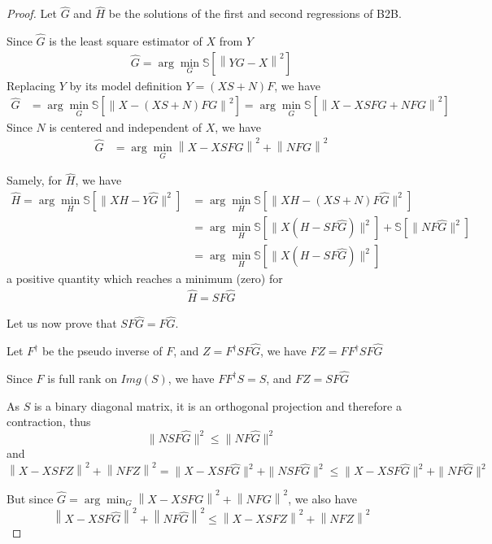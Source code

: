 \documentclass{article}
\begin{document}
\begin{proof}

 Let $\hat G$ and $\hat H$ be the solutions of the first and second regressions of B2B.

 Since $\hat G$ is the least square estimator of $X$ from $Y$
 \begin{align*}
    \hat G = \arg \min_G \mathbb{S}[\left \| YG - X \right \|^2]
\end{align*}
Replacing $Y$ by its model definition $Y = (XS+N)F$, we have
 \begin{align*}
    \hat G &=   \arg \min_G \mathbb{S}[\left \| X - (XS + N)FG \right\|^2] =\arg \min_G \mathbb{S}[\left \| X - XSFG + NFG \right\|^2]
  \end{align*}
  Since $N$ is centered and independent of $X$, we have
  \begin{align}
    	  \hat G &=  \arg \min_G \left \| X - XSFG\right\| ^2  + \left \| NFG\right \| ^2
     \label{eq:Gdoublenorm}
\end{align}

Samely, for $\hat H$, we have
\begin{align*}
    \hat H = \arg \min_H \mathbb{S}[\| XH - Y \hat{G} \|^2] &=\arg  \min_H \mathbb{S}[\| XH - (XS + N)F \hat G \|^2] \\
    &=\arg \min_H \mathbb{S}[\| X(H - SF \hat G) \| ^2] + \mathbb{S}[\| NF\hat G \| ^2]\\
    &= \arg \min_H \mathbb{S}[\| X(H - SF \hat G) \| ^2]
 \end{align*}
 a positive quantity which reaches a minimum (zero) for
 \begin{align}
    \hat H = SF \hat G
    \label{eq:Hdoublenom}
\end{align}

Let us now prove that $SF\hat G = F\hat G$.

Let $F^\dagger$ be the pseudo inverse of $F$, and $Z=F^\dagger SF\hat G$, we have $FZ = FF^\dagger SF \hat G$

Since $F$ is full rank on $Img(S)$, we have $FF^\dagger S =S$, and $FZ = SF\hat G$

As $S$ is a binary diagonal matrix, it is an orthogonal projection and therefore a contraction, thus
 $$ \| NSF\hat G\|^2 \leq \| NF\hat G \|^2$$ and
 $$\left \| X - XSFZ\right \| ^2  + \left \| NFZ\right \| ^2 = \| X - XSF\hat G \| ^2  + \| NSF\hat G \| ^2 \leq \| X - XSF\hat G \| ^2  + \| NF\hat G \| ^2$$

But since $\hat G =  \arg \min_G \left \| X - XSFG\right\| ^2  + \left \| NFG\right \| ^2$, we also have
$$\left \| X - XSF\hat G\right\| ^2  + \left \| NF\hat G\right \| ^2 \leq \left \| X - XSFZ\right \| ^2  + \left \| NFZ\right \| ^2$$


\end{proof}
\end{document}
